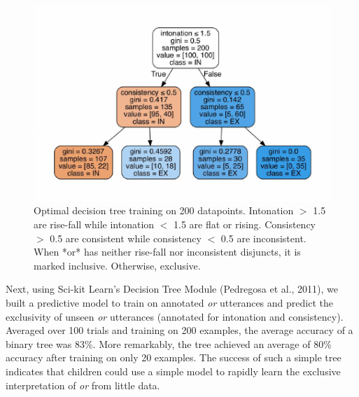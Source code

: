 \documentclass[10pt, letterpaper]{article}
\newenvironment{CodeChunk}{}{}
\begin{document}
\begin{CodeChunk}
\begin{figure}[H]

\includegraphics{figs/treeDiagram-1} \hfill{}

\caption[Optimal decision tree training on 200 datapoints]{Optimal decision tree training on 200 datapoints. Intonation $>$ 1.5 are rise-fall while intonation $<$ 1.5 are flat or rising. Consistency $>$ 0.5 are consistent while consistency $<$ 0.5 are  inconsistent. When *or* has neither rise-fall nor inconsistent disjuncts, it is marked inclusive. Otherwise, exclusive.}\label{fig:treeDiagram}
\end{figure}
\end{CodeChunk}

Next, using Sci-kit Learn's Decision Tree Module (Pedregosa et al.,
2011), we built a predictive model to train on annotated \emph{or}
utterances and predict the exclusivity of unseen \emph{or} utterances
(annotated for intonation and consistency). Averaged over 100 trials and
training on 200 examples, the average accuracy of a binary tree was
83\%. More remarkably, the tree achieved an average of 80\% accuracy
after training on only 20 examples. The success of such a simple tree
indicates that children could use a simple model to rapidly learn the
exclusive interpretation of \emph{or} from little data.
\end{document}
